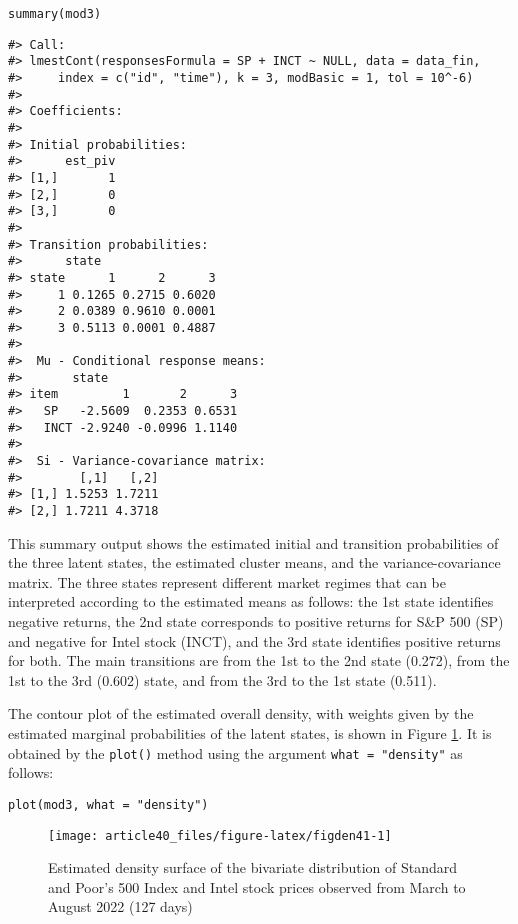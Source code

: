 \begin{verbatim}
summary(mod3)
\end{verbatim}

\begin{verbatim}
#> Call:
#> lmestCont(responsesFormula = SP + INCT ~ NULL, data = data_fin, 
#>     index = c("id", "time"), k = 3, modBasic = 1, tol = 10^-6)
#> 
#> Coefficients:
#> 
#> Initial probabilities:
#>      est_piv
#> [1,]       1
#> [2,]       0
#> [3,]       0
#> 
#> Transition probabilities:
#>      state
#> state      1      2      3
#>     1 0.1265 0.2715 0.6020
#>     2 0.0389 0.9610 0.0001
#>     3 0.5113 0.0001 0.4887
#> 
#>  Mu - Conditional response means:
#>       state
#> item         1       2      3
#>   SP   -2.5609  0.2353 0.6531
#>   INCT -2.9240 -0.0996 1.1140
#> 
#>  Si - Variance-covariance matrix:
#>        [,1]   [,2]
#> [1,] 1.5253 1.7211
#> [2,] 1.7211 4.3718
\end{verbatim}

This summary output shows the estimated initial and transition
probabilities of the three latent states, the estimated cluster means,
and the variance-covariance matrix. The three states represent different
market regimes that can be interpreted according to the estimated means
as follows: the 1st state identifies negative returns, the 2nd state
corresponds to positive returns for S\&P 500 (SP) and negative for
Intel stock (INCT), and the 3rd state identifies positive returns
for both. The main transitions are from the 1st to the 2nd state
(0.272), from the 1st to the 3rd (0.602) state, and from the 3rd to the
1st state (0.511).

The contour plot of the estimated overall density, with weights given by
the estimated marginal probabilities of the latent states, is shown in
Figure \ref{fig:figden41}. It is obtained by the \texttt{plot()} method using
the argument \texttt{what\ =\ "density"} as follows:

\begin{verbatim}
plot(mod3, what = "density")
\end{verbatim}

\begin{figure}

{\centering \texttt{[image: article40\_files/figure-latex/figden41-1]} 

}

\caption{Estimated density surface of the bivariate distribution of Standard and Poor's  500 Index and Intel stock prices observed from March to August 2022  (127 days)}\label{fig:figden41}
\end{figure}

